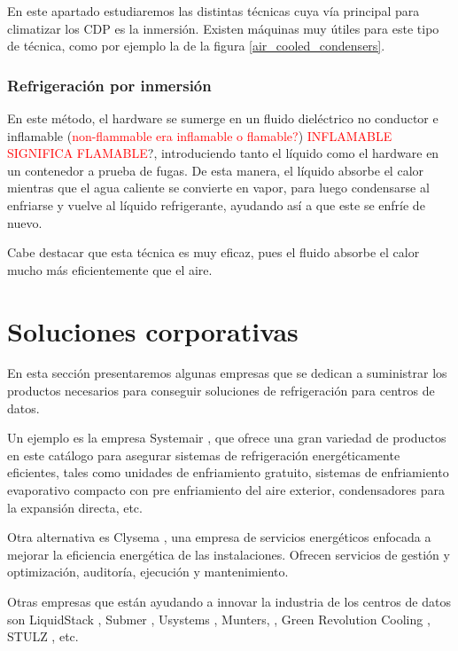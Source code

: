 En este apartado estudiaremos las distintas técnicas cuya vía principal para climatizar los CDP es la inmersión. Existen máquinas muy útiles para este tipo de técnica, como por ejemplo la de la figura \ref{air_cooled_condensers}.

\subsubsection{Refrigeración por inmersión}

En este método, el hardware se sumerge en un fluido dieléctrico no conductor e inflamable (\textcolor{red}{non-flammable era inflamable o flamable?}) \textcolor{red}{INFLAMABLE SIGNIFICA FLAMABLE}?, introduciendo tanto el líquido como el hardware en un contenedor a prueba de fugas. De esta manera, el líquido absorbe el calor mientras que el agua caliente se convierte en vapor, para luego condensarse al enfriarse y vuelve al líquido refrigerante, ayudando así a que este se enfríe de nuevo.

Cabe destacar que esta técnica es muy eficaz, pues el fluido absorbe el calor mucho más eficientemente que el aire.

\section{Soluciones corporativas}

En esta sección presentaremos algunas empresas que se dedican a suministrar los productos necesarios para conseguir soluciones de refrigeración para centros de datos.

Un ejemplo es la empresa Systemair \cite{systemair}, que ofrece una gran variedad de productos en este catálogo para asegurar sistemas de refrigeración energéticamente eficientes, tales como unidades de enfriamiento gratuito, sistemas de enfriamiento evaporativo compacto con pre enfriamiento del aire exterior, condensadores para la expansión directa, etc.

Otra alternativa es Clysema \cite{clysema}, una empresa de servicios energéticos enfocada a mejorar la eficiencia energética de las instalaciones. Ofrecen servicios de gestión y optimización, auditoría, ejecución y mantenimiento.

Otras empresas que están ayudando a innovar la industria de los centros de datos son LiquidStack \cite{liquidstack}, Submer \cite{submer}, Usystems \cite{usystems}, Munters, \cite{munters}, Green Revolution Cooling \cite{GRC}, STULZ \cite{stulz}, etc.

